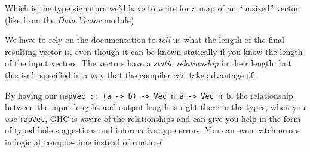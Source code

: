 \documentclass[]{article}
\begin{document}
Which is the type signature we'd have to write for a map of an ``unsized''
vector (like from the \emph{Data.Vector} module)

We have to rely on the documentation to \emph{tell} us what the length of the
final resulting vector is, even though it can be known statically if you know
the length of the input vectors. The vectors have a \emph{static relationship}
in their length, but this isn't specified in a way that the compiler can take
advantage of.

By having our
\texttt{mapVec\ ::\ (a\ -\textgreater{}\ b)\ -\textgreater{}\ Vec\ n\ a\ -\textgreater{}\ Vec\ n\ b},
the relationship between the input lengths and output length is right there in
the types, when you \emph{use} \texttt{mapVec}, GHC is aware of the
relationships and can give you help in the form of typed hole suggestions and
informative type errors. You can even catch errors in logic at compile-time
instead of runtime!
\end{document}
